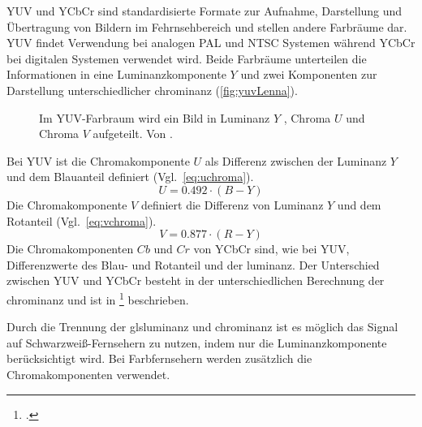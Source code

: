 YUV und YCbCr sind standardisierte Formate zur Aufnahme, Darstellung und Übertragung von Bildern im Fehrnsehbereich und
stellen andere Farbräume dar. YUV findet Verwendung bei analogen PAL und NTSC Systemen während YCbCr bei digitalen
Systemen verwendet wird. Beide Farbräume unterteilen die Informationen in eine Luminanzkomponente $Y$ und zwei
Komponenten zur Darstellung unterschiedlicher \gls{chrominanz} (\autoref{fig:yuvLenna}).
\begin{figure}[!ht]
	\centering
	\caption{Im YUV-Farbraum wird ein Bild  in Luminanz $Y$ ,
		Chroma $U$  und Chroma $V$  aufgeteilt. Von
		 \cite{lenna}.
	}
	\label{fig:yuvLenna}
\end{figure}

Bei YUV ist die Chromakomponente $U$ als Differenz zwischen der Luminanz $Y$ und dem Blauanteil definiert (Vgl.~\autoref{eq:uchroma}).
\begin{equation}
	U = 0.492 \cdot \left(B-Y\right)
	\label{eq:uchroma}
\end{equation}
Die Chromakomponente $V$ definiert die Differenz von Luminanz $Y$ und dem Rotanteil (Vgl.~\autoref{eq:vchroma}).
\begin{equation}
	V = 0.877 \cdot \left(R-Y\right)
	\label{eq:vchroma}
\end{equation}
Die Chromakomponenten $Cb$ und $Cr$ von YCbCr sind, wie bei YUV, Differenzwerte des Blau- und Rotanteil und der
 \gls{luminanz}. Der Unterschied zwischen YUV und YCbCr besteht in der unterschiedlichen Berechnung der
 \gls{chrominanz} und ist in \citeauthor{burger05}\footcite[][S.265--266]{burger05} beschrieben.

Durch die Trennung der gls{luminanz} und \gls{chrominanz} ist es möglich das Signal auf Schwarzweiß-Fernsehern zu
 nutzen, indem nur die Luminanzkomponente berücksichtigt wird. Bei Farbfernsehern werden zusätzlich die
 Chromakomponenten verwendet.



